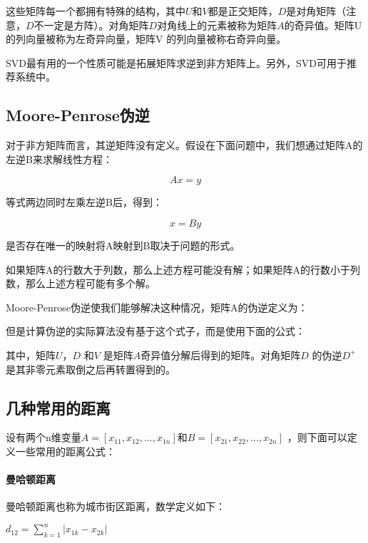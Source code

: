 \documentclass[11pt]{book}
\newcounter{#2}
\newcounter{#2}[#1]
\numberwithin{#2}{#1}
\begin{document}
这些矩阵每一个都拥有特殊的结构，其中$ U $和$ V $都是正交矩阵，$ D $是对角矩阵（注意，$ D $不一定是方阵）。对角矩阵$ D $对角线上的元素被称为矩阵$ A $的奇异值。矩阵U的列向量被称为左奇异向量，矩阵V 的列向量被称右奇异向量。

SVD最有用的一个性质可能是拓展矩阵求逆到非方矩阵上。另外，SVD可用于推荐系统中。
\subsection{Moore-Penrose伪逆}

对于非方矩阵而言，其逆矩阵没有定义。假设在下面问题中，我们想通过矩阵A的左逆B来求解线性方程：

\begin{center}\begin{equation} Ax=y \end{equation}\end{center}
等式两边同时左乘左逆B后，得到：

\begin{center}\begin{equation}x=By\end{equation}\end{center}
是否存在唯一的映射将A映射到B取决于问题的形式。

如果矩阵A的行数大于列数，那么上述方程可能没有解；如果矩阵A的行数小于列数，那么上述方程可能有多个解。

Moore-Penrose伪逆使我们能够解决这种情况，矩阵A的伪逆定义为：

但是计算伪逆的实际算法没有基于这个式子，而是使用下面的公式：

其中，矩阵$ U $，$ D $ 和$ V $ 是矩阵$ A $奇异值分解后得到的矩阵。对角矩阵$ D $ 的伪逆$ D^{+} $ 是其非零元素取倒之后再转置得到的。

\subsection{几种常用的距离}

设有两个n维变量$ A=\left[ x_{11}, x_{12},...,x_{1n}   \right] $和$ B=\left[ x_{21} ,x_{22} ,...,x_{2n}  \right] $ ，则下面可以定义一些常用的距离公式：

\paragraph{曼哈顿距离}

曼哈顿距离也称为城市街区距离，数学定义如下：

$ d_{12} =\sum_{k=1}^{n}{\left| x_{1k}-x_{2k} \right| } $ 
\end{document}
